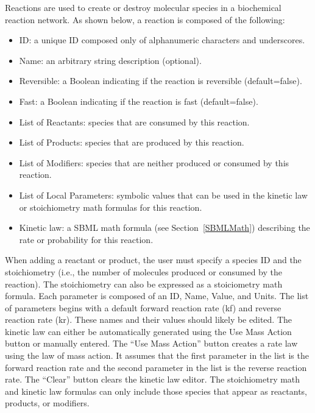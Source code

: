 \documentclass[titlepage,11pt]{article}
\begin{document}
\noindent
Reactions are used to create or destroy molecular species in a
biochemical reaction network.  As shown below, a 
reaction is composed of the following:
\begin{itemize}
\item ID: a unique ID composed only of alphanumeric characters and 
       underscores.
\item Name: an arbitrary string description (optional).
\item Reversible: a Boolean indicating if the reaction is reversible
       (default=false).
\item Fast: a Boolean indicating if the reaction is fast (default=false).
\item List of Reactants: species that are consumed by this reaction.
\item List of Products: species that are produced by this reaction.
\item List of Modifiers: species that are neither produced or consumed 
       by this reaction.
\item List of Local Parameters: symbolic values that can be used in
       the kinetic law or stoichiometry math formulas for this reaction.
\item Kinetic law: a SBML math formula (see Section~\ref{SBMLMath})
       describing the rate or probability for this reaction.
\end{itemize}
When adding a reactant or product, the user must specify a species ID and 
the stoichiometry (i.e., the number of molecules produced or consumed by the
reaction).  The stoichiometry can also be expressed as a stoiciometry math
formula.  Each parameter is composed of an ID, Name, Value, and Units.
The list of parameters begins with a default forward
reaction rate (kf) and reverse reaction rate (kr). These names
and their values should likely be edited. The kinetic law can
either be automatically generated using the Use Mass Action
button or manually entered.  The
``Use Mass Action'' button creates a rate law using the
law of mass action. It assumes that the first parameter in the
list is the forward reaction rate and the second parameter in the
list is the reverse reaction rate.  
The ``Clear'' button clears the kinetic law editor. 
The stoichiometry math and kinetic law formulas can only include
those species that appear as reactants, products, or modifiers.
\end{document}
